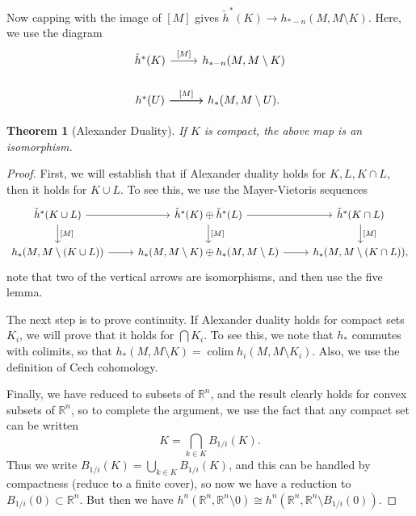 \documentclass[leqno, openany]{memoir}
\newtheorem{thm}{Theorem}[section]
\theoremstyle{definition}
\theoremstyle{remark}
\theoremstyle{plain}
\theoremstyle{definition}
\theoremstyle{remark}
\newcommand{\R}{\mathbb{R}}
\begin{document}
Now capping with the image of $[M]$ gives $\check{h}^*(K) \to h_{*-n}(M, M \setminus K)$. Here, we use the diagram
\begin{equation*}
\begin{tikzcd}
    \check{h}^*(K) \arrow{r}{{[M]}} & h_{*-n}(M, M \setminus K) \\
    h^*(U) \arrow{r} \arrow{r}{{[M]}} & h_*(M, M \setminus U). 
\end{tikzcd}
\end{equation*}


\begin{thm}[Alexander Duality]
    If $K$ is compact, the above map is an isomorphism.
\end{thm}

\begin{proof}
    First, we will establish that if Alexander duality holds for $K, L, K \cap L$, then it holds for $K \cup L$. To see this, we use the Mayer-Vietoris sequences
    \begin{equation*}
    \begin{tikzcd}
        \check{h}^*(K \cup L) \arrow{r} \arrow{d}{{[M]}} & \check{h}^*(K) \oplus \check{h}^*(L) \arrow{r} \arrow{d}{{[M]}} & \check{h}^*(K \cap L) \arrow{d}{{[M]}} \\
        h_*(M, M \setminus (K \cup L)) \arrow{r} & h_*(M, M \setminus K) \oplus h_*(M, M \setminus L) \arrow{r} & h_*(M, M \setminus (K \cap L)),
    \end{tikzcd}
    \end{equation*}
    note that two of the vertical arrows are isomorphisms, and then use the five lemma.

    The next step is to prove continuity. If Alexander duality holds for compact sets $K_i$, we will prove that it holds for $\bigcap K_i$. To see this, we note that $h_*$ commutes with colimits, so that $h_*(M, M \setminus K) = \operatorname{colim} h_i(M, M \setminus K_i)$. Also, we use the definition of Cech cohomology.

    Finally, we have reduced to subsets of $\R^n$, and the result clearly holds for convex subsets of $\R^n$, so to complete the argument, we use the fact that any compact set can be written
    \[ K = \bigcap_{k \in K} B_{1/i}(K). \]
    Thus we write $B_{1/i}(K) = \bigcup_{k \in K} B_{1/i}(K)$, and this can be handled by compactness (reduce to a finite cover), so now we have a reduction to $B_{1/i}(0) \subset \R^n$. But then we have $h^n(\R^n, \R^n \setminus 0) \cong h^n(\R^n, \R^n \setminus B_{1/i}(0))$.
\end{proof}
\end{document}

